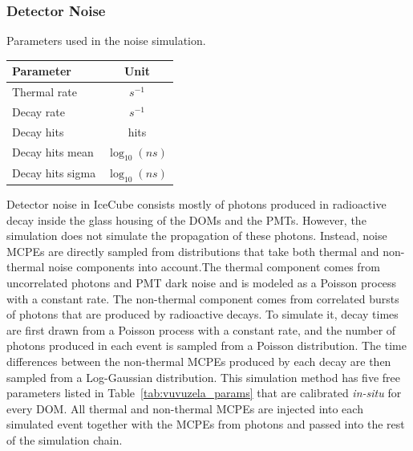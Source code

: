 \subsubsection{Detector Noise}

\begin{margintable}
\caption{\label{tab:vuvuzela_params} Parameters used in the noise simulation. }
    \begin{tabular}{lc}\toprule
        \textbf{Parameter} & \textbf{Unit} \\ \midrule
        Thermal rate &  $s^{-1}$ \\ 
        Decay rate &  $s^{-1}$ \\
        Decay hits &  hits \\ 
        Decay hits mean &  $\log_{10} (ns) $\\ 
        Decay hits sigma &  $\log_{10} (ns) $ \\ \bottomrule
    \end{tabular}
\end{margintable}
Detector noise in IceCube consists mostly of photons produced in radioactive decay inside the glass housing of the DOMs and the PMTs. However, the simulation does not simulate the propagation of these photons. Instead, noise MCPEs are directly sampled from distributions that take both thermal and non-thermal noise components into account.The thermal component comes from uncorrelated photons and PMT dark noise and is modeled as a Poisson process with a constant rate. The non-thermal component comes from correlated bursts of photons that are produced by radioactive decays. To simulate it, decay times are first drawn from a Poisson process with a constant rate, and the number of photons produced in each event is sampled from a Poisson distribution. The time differences between the non-thermal MCPEs produced by each decay are then sampled from a Log-Gaussian distribution. This simulation method has five free parameters listed in Table~\ref{tab:vuvuzela_params} that are calibrated \emph{in-situ} for every DOM. All thermal and non-thermal MCPEs are injected into each simulated event together with the MCPEs from photons and passed into the rest of the simulation chain.

